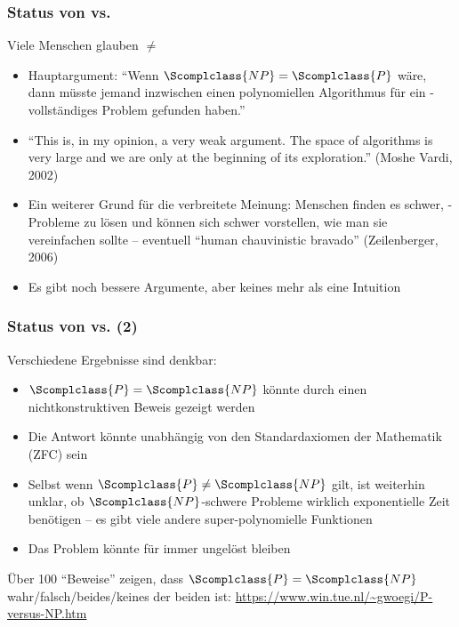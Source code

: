 \documentclass[aspectratio=1610,onlymath]{beamer}
\begin{document}
\begin{frame}\frametitle{Status von  vs. }

  Viele Menschen glauben  ${}\neq{}$ 
	\begin{itemize}
	\item Hauptargument: "`Wenn $\Scomplclass{NP} = \Scomplclass{P}$ wäre, dann müsste jemand inzwischen einen polynomiellen Algorithmus für ein -vollständiges Problem gefunden haben."'
	\item ``This is, in my opinion, a very weak argument. The space of algorithms is very large and we are only at the beginning of its exploration.'' (Moshe Vardi, 2002)
	\item Ein weiterer Grund für die verbreitete Meinung: Menschen finden es schwer, -Probleme zu lösen und können sich schwer vorstellen, wie man sie vereinfachen sollte
	-- eventuell ``human chauvinistic bravado'' (Zeilenberger, 2006)
	\item Es gibt noch bessere Argumente, aber keines mehr als eine Intuition
	\end{itemize}
\end{frame}

\begin{frame}\frametitle{Status von  vs.  (2)}

  Verschiedene Ergebnisse sind denkbar:\pause
  \begin{itemize}
	\item $\Scomplclass{P} =  \Scomplclass{NP}$ könnte durch einen nichtkonstruktiven Beweis gezeigt werden\pause
	\item Die Antwort könnte unabhängig von den Standardaxiomen der Mathematik (ZFC) sein\pause
	\item Selbst wenn $\Scomplclass{P} \neq \Scomplclass{NP}$ gilt, ist weiterhin unklar, ob $\Scomplclass{NP}$-schwere Probleme wirklich exponentielle Zeit benötigen -- es gibt viele andere super-polynomielle Funktionen \ghost{\ldots}\pause
	\item Das Problem könnte für immer ungelöst bleiben\pause
  \end{itemize}\bigskip
  
  Über 100 "`Beweise"' zeigen, dass $\Scomplclass{P} = \Scomplclass{NP}$ wahr/falsch/beides/keines der beiden ist: \url{https://www.win.tue.nl/~gwoegi/P-versus-NP.htm}
   
\end{frame}
\end{document}
